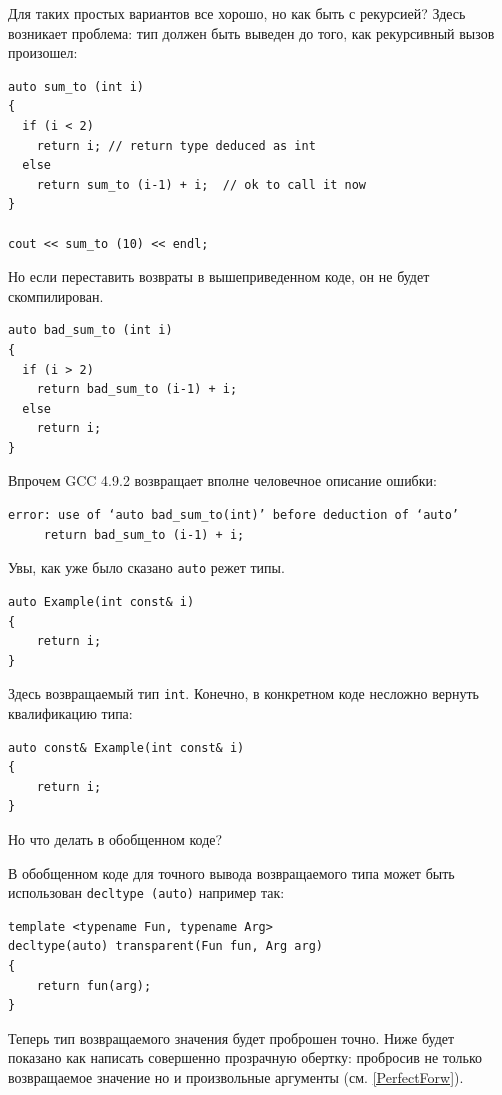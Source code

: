 \documentclass[a4paper,12pt,oneside]{article}
\begin{document}
Для таких простых вариантов все хорошо, но как быть с рекурсией? Здесь возникает проблема: тип должен быть выведен до того, как рекурсивный вызов произошел:

\begin{lstlisting}
auto sum_to (int i)
{
  if (i < 2)
    return i; // return type deduced as int
  else
    return sum_to (i-1) + i;  // ok to call it now
}

cout << sum_to (10) << endl;
\end{lstlisting}

Но если переставить возвраты в вышеприведенном коде, он не будет скомпилирован.

\begin{lstlisting}
auto bad_sum_to (int i)
{
  if (i > 2)
    return bad_sum_to (i-1) + i;
  else
    return i;
}
\end{lstlisting}

Впрочем GCC 4.9.2 возвращает вполне человечное описание ошибки:

\begin{verbatim}
error: use of ‘auto bad_sum_to(int)’ before deduction of ‘auto’
     return bad_sum_to (i-1) + i;
\end{verbatim}

Увы, как уже было сказано \lstinline!auto! режет типы. 

\begin{lstlisting}
auto Example(int const& i) 
{ 
    return i; 
}
\end{lstlisting}

Здесь возвращаемый тип \lstinline!int!. Конечно, в конкретном коде несложно вернуть квалификацию типа:

\begin{lstlisting}
auto const& Example(int const& i) 
{ 
    return i; 
}
\end{lstlisting}

Но что делать в обобщенном коде?

В обобщенном коде для точного вывода возвращаемого типа может быть использован \lstinline!decltype (auto)! например так:

\begin{lstlisting}
template <typename Fun, typename Arg>
decltype(auto) transparent(Fun fun, Arg arg) 
{ 
    return fun(arg); 
}
\end{lstlisting}

Теперь тип возвращаемого значения будет проброшен точно. Ниже будет показано как написать совершенно прозрачную обертку: пробросив не только возвращаемое значение но и произвольные аргументы (см. \ref{PerfectForw}).
\end{document}
